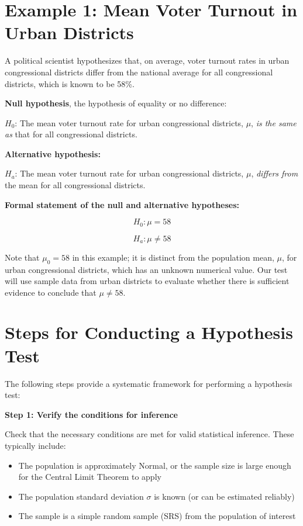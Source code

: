 \documentclass[
  letterpaper,
  DIV=11,
  numbers=noendperiod]{scrreprt}
\providecommand{\tightlist}{%
  \setlength{\itemsep}{0pt}\setlength{\parskip}{0pt}}
\begin{document}
\section{Example 1: Mean Voter Turnout in Urban
Districts}\label{example-1-mean-voter-turnout-in-urban-districts}

A political scientist hypothesizes that, on average, voter turnout rates
in urban congressional districts differ from the national average for
all congressional districts, which is known to be 58\%.

\textbf{Null hypothesis}, the hypothesis of equality or no difference:

\(H_0\): The mean voter turnout rate for urban congressional districts,
\(\mu\), \emph{is the same as} that for all congressional districts.

\textbf{Alternative hypothesis:}

\(H_a\): The mean voter turnout rate for urban congressional districts,
\(\mu\), \emph{differs from} the mean for all congressional districts.

\textbf{Formal statement of the null and alternative hypotheses:}

\[
H_0: \mu = 58
\]

\[
H_a: \mu \neq 58
\]

Note that \(\mu_0 = 58\) in this example; it is distinct from the
population mean, \(\mu\), for urban congressional districts, which has
an unknown numerical value. Our test will use sample data from urban
districts to evaluate whether there is sufficient evidence to conclude
that \(\mu \neq 58\).

\section{Steps for Conducting a Hypothesis
Test}\label{steps-for-conducting-a-hypothesis-test}

The following steps provide a systematic framework for performing a
hypothesis test:

\textbf{Step 1: Verify the conditions for inference}

Check that the necessary conditions are met for valid statistical
inference. These typically include:

\begin{itemize}
\tightlist
\item
  The population is approximately Normal, or the sample size is large
  enough for the Central Limit Theorem to apply
\item
  The population standard deviation \(\sigma\) is known (or can be
  estimated reliably)
\item
  The sample is a simple random sample (SRS) from the population of
  interest
\end{itemize}
\end{document}
